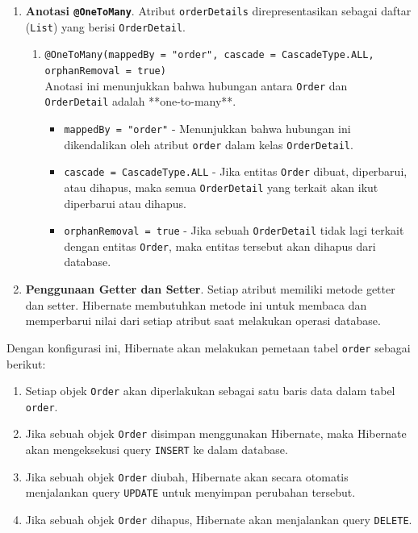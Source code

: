 \begin{enumerate}
	\item \textbf{Anotasi \texttt{@OneToMany}}.
	Atribut \texttt{orderDetails} direpresentasikan sebagai daftar (\texttt{List}) yang berisi \texttt{OrderDetail}. 
	\begin{enumerate}
		\item \texttt{@OneToMany(mappedBy = "order", cascade = CascadeType.ALL, orphanRemoval = true)} \\
		Anotasi ini menunjukkan bahwa hubungan antara \texttt{Order} dan \texttt{OrderDetail} adalah **one-to-many**.
		\begin{itemize}
			\item \texttt{mappedBy = "order"} - Menunjukkan bahwa hubungan ini dikendalikan oleh atribut \texttt{order} dalam kelas \texttt{OrderDetail}.
			\item \texttt{cascade = CascadeType.ALL} - Jika entitas \texttt{Order} dibuat, diperbarui, atau dihapus, maka semua \texttt{OrderDetail} yang terkait akan ikut diperbarui atau dihapus.
			\item \texttt{orphanRemoval = true} - Jika sebuah \texttt{OrderDetail} tidak lagi terkait dengan entitas \texttt{Order}, maka entitas tersebut akan dihapus dari database.
		\end{itemize}
	\end{enumerate}
	
	\item \textbf{Penggunaan Getter dan Setter}.
	Setiap atribut memiliki metode getter dan setter. Hibernate membutuhkan metode ini untuk membaca dan memperbarui nilai dari setiap atribut saat melakukan operasi database.
	
\end{enumerate}

Dengan konfigurasi ini, Hibernate akan melakukan pemetaan tabel \texttt{order} sebagai berikut:
\begin{enumerate}
	\item Setiap objek \texttt{Order} akan diperlakukan sebagai satu baris data dalam tabel \texttt{order}.
	\item Jika sebuah objek \texttt{Order} disimpan menggunakan Hibernate, maka Hibernate akan mengeksekusi query \texttt{INSERT} ke dalam database.
	\item Jika sebuah objek \texttt{Order} diubah, Hibernate akan secara otomatis menjalankan query \texttt{UPDATE} untuk menyimpan perubahan tersebut.
	\item Jika sebuah objek \texttt{Order} dihapus, Hibernate akan menjalankan query \texttt{DELETE}.
\end{enumerate}

